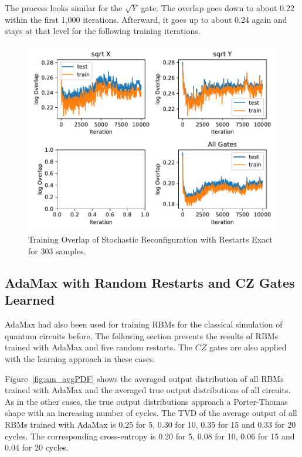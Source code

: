 The process looks similar for the $\sqrt{Y}$ gate. The overlap goes down to about 0.22 within the 
first 1,000 iterations. Afterward, it goes up to about 0.24 again and stays at that level for the 
following training iterations.

\begin{figure}[H]
  \centering
  \includegraphics[width=\textwidth]{figures/results/SR-restarts-not-learned/avgOverlap_303.pdf}
  \caption[Training Overlap of Stochastic Reconfiguration with Restarts Exact]{Training 
  Overlap of Stochastic Reconfiguration with Restarts Exact for 303 samples.}
  \label{fig:sr_tvd}
\end{figure}

\newpage

\subsection{AdaMax with Random Restarts and CZ Gates Learned}

AdaMax had also been used for training RBMs for the 
classical simulation of quantum circuits before. The following section presents the results
of RBMs trained with AdaMax and five random restarts. The $CZ$ gates are also applied with the 
learning approach in these cases.

Figure~\ref{fig:am_avgPDF} shows the averaged output distribution of all RBMs trained with AdaMax and 
the averaged true output distributions of all circuits. As in the other cases, the 
true output distributions approach a Porter-Thomas shape with an increasing number of cycles.
The TVD of the average output of all RBMs trained with AdaMax
is 0.25 for 5, 0.30 for 10, 0.35 for 15 and 0.33 for 20 cycles. The corresponding cross-entropy is 
0.20 for 5, 0.08 for 10, 0.06 for 15 and 0.04 for 20 cycles.

